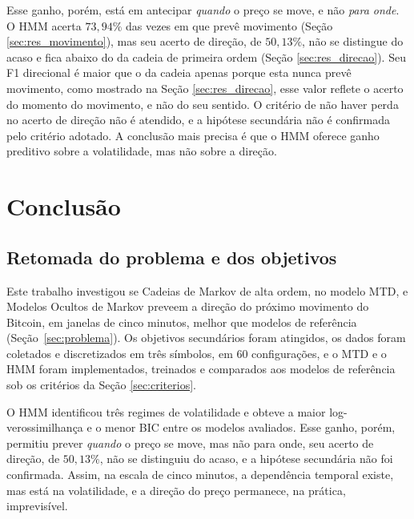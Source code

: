 \documentclass[
    12pt,                %
    openright,           %
    oneside,             %
    a4paper,             %
    english,             %
    brazil               %
]{abntex2}
\begin{document}
Esse ganho, porém, está em antecipar \textit{quando} o preço se move, e não \textit{para onde}. O HMM acerta $73{,}94\%$ das vezes em que prevê movimento (Seção \ref{sec:res_movimento}), 
mas seu acerto de direção, de $50{,}13\%$, não se distingue do acaso e fica abaixo do da cadeia de primeira ordem (Seção \ref{sec:res_direcao}). Seu F1 direcional é 
maior que o da cadeia apenas porque esta nunca prevê movimento, como mostrado na Seção \ref{sec:res_direcao}, esse valor reflete o acerto do momento do movimento, e não do seu sentido. 
O critério de não haver perda no acerto de direção não é atendido, e a hipótese secundária não é confirmada pelo critério adotado. 
A conclusão mais precisa é que o HMM oferece ganho preditivo sobre a volatilidade, mas não sobre a direção.

\chapter{Conclusão}

\section{Retomada do problema e dos objetivos}
\label{sec:conc_retomada}

Este trabalho investigou se Cadeias de Markov de alta ordem, no modelo MTD, e Modelos Ocultos de Markov preveem a direção do próximo movimento do Bitcoin, 
em janelas de cinco minutos, melhor que modelos de referência (Seção~\ref{sec:problema}). Os objetivos secundários foram atingidos, os dados foram coletados e 
discretizados em três símbolos, em 60 configurações, e o MTD e o HMM foram implementados, treinados e comparados aos modelos de referência sob os critérios da Seção \ref{sec:criterios}.


O HMM identificou três regimes de volatilidade e obteve a maior log-verossimilhança e o menor BIC entre os modelos avaliados. Esse ganho, porém, permitiu prever \textit{quando} o 
preço se move, mas não para onde, seu acerto de direção, de $50{,}13\%$, não se distinguiu do acaso, e a hipótese secundária não foi confirmada. Assim, na escala de cinco minutos, 
a dependência temporal existe, mas está na volatilidade, e a direção do preço permanece, na prática, imprevisível.
\end{document}
